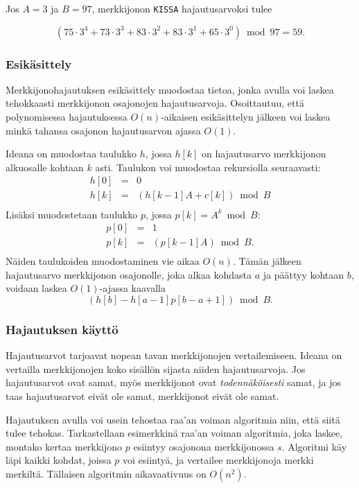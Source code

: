Jos $A=3$ ja $B=97$, merkkijonon \texttt{KISSA} hajautusarvoksi tulee

\[(75 \cdot 3^4 + 73 \cdot 3^3 + 83 \cdot 3^2 + 83 \cdot 3^1 + 65 \cdot 3^0) \bmod 97 = 59.\]

\subsubsection*{Esikäsittely}

Merkkijonohajautuksen esikäsittely
muodostaa tietoa, jonka avulla 
voi laskea tehokkaasti merkkijonon
osajonojen hajautusarvoja.
Osoittautuu, että polynomisessa hajautuksessa
$O(n)$-aikaisen esikäsittelyn jälkeen voi laskea
minkä tahansa osajonon hajautusarvon
ajassa $O(1)$.

Ideana on muodostaa taulukko $h$,
jossa $h[k]$ on hajautusarvo merkkijonon
alkuosalle kohtaan $k$ asti.
Taulukon voi muodostaa rekursiolla seuraavasti:
\[
\begin{array}{lcl}
h[0] & = & 0 \\
h[k] & = & (h[k-1] A + c[k]) \bmod B \\
\end{array}
\]
Lisäksi muodostetaan taulukko $p$,
jossa $p[k]=A^k \bmod B$:
\[
\begin{array}{lcl}
p[0] & = & 1 \\
p[k] & = & (p[k-1] A) \bmod B. \\
\end{array}
\]
Näiden taulukoiden muodostaminen vie aikaa $O(n)$.
Tämän jälkeen hajautusarvo merkkijonon osajonolle,
joka alkaa kohdasta $a$ ja päättyy kohtaan $b$,
voidaan laskea $O(1)$-ajassa kaavalla
\[(h[b]-h[a-1] p[b-a+1]) \bmod B.\]

\subsubsection*{Hajautuksen käyttö}

Hajautusarvot tarjoavat nopean tavan merkkijonojen
vertailemiseen.
Ideana on vertailla merkkijonojen koko sisällön
sijasta niiden hajautusarvoja.
Jos hajautusarvot ovat samat,
myös merkkijonot ovat \textit{todennäköisesti} samat,
ja jos taas hajautusarvot eivät ole samat,
merkkijonot eivät ole samat.

Hajautuksen avulla voi usein tehostaa
raa'an voiman algoritmia niin, että siitä tulee tehokas.
Tarkastellaan esimerkkinä
raa'an voiman algoritmia, joka laskee,
montako kertaa merkkijono $p$
esiintyy osajonona merkkijonossa $s$.
Algoritmi käy läpi kaikki kohdat,
joissa $p$ voi esiintyä,
ja vertailee merkkijonoja merkki merkiltä.
Tällaisen algoritmin aikavaativuus on $O(n^2)$.

